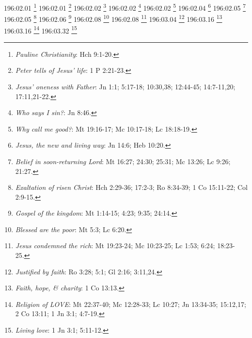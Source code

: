 196:02.01 \footnote{\textit{Pauline Christianity}: Hch 9:1-20.}
196:02.01 \footnote{\textit{Peter tells of Jesus' life}: 1 P 2:21-23.}
196:02.02 \footnote{\textit{Jesus' oneness with Father}: Jn 1:1; 5:17-18; 10:30,38; 12:44-45; 14:7-11,20; 17:11,21-22.}
196:02.02 \footnote{\textit{Who says I sin?}: Jn 8:46.}
196:02.02 \footnote{\textit{Why call me good?}: Mt 19:16-17; Mc 10:17-18; Lc 18:18-19.}
196:02.04 \footnote{\textit{Jesus, the new and living way}: Jn 14:6; Heb 10:20.}
196:02.05 \footnote{\textit{Belief in soon-returning Lord}: Mt 16:27; 24:30; 25:31; Mc 13:26; Lc 9:26; 21:27.}
196:02.05 \footnote{\textit{Exaltation of risen Christ}: Hch 2:29-36; 17:2-3; Ro 8:34-39; 1 Co 15:11-22; Col 2:9-15.}
196:02.06 \footnote{\textit{Gospel of the kingdom}: Mt 1:14-15; 4:23; 9:35; 24:14.}
196:02.08 \footnote{\textit{Blessed are the poor}: Mt 5:3; Lc 6:20.}
196:02.08 \footnote{\textit{Jesus condemned the rich}: Mt 19:23-24; Mc 10:23-25; Lc 1:53; 6:24; 18:23-25.}
196:03.04 \footnote{\textit{Justified by faith}: Ro 3:28; 5:1; Gl 2:16; 3:11,24.}
196:03.16 \footnote{\textit{Faith, hope, & charity}: 1 Co 13:13.}
196:03.16 \footnote{\textit{Religion of LOVE}: Mt 22:37-40; Mc 12:28-33; Lc 10:27; Jn 13:34-35; 15:12,17; 2 Co 13:11; 1 Jn 3:1; 4:7-19.}
196:03.32 \footnote{\textit{Living love}: 1 Jn 3:1; 5:11-12.}
